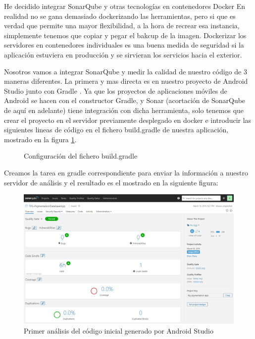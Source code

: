 He decidido integrar SonarQube y otras tecnologías en contenedores Docker \cite{docker} En realidad no se gana demasiado dockerizando las herramientas, pero si que es verdad que permite una mayor flexibilidad, a la hora de recrear esa instancia, simplemente tenemos que copiar y pegar el bakcup de la imagen. Dockerizar los servidores en contenedores individuales es una buena medida de seguridad si la aplicación estuviera en producción y se sirvieran los servicios hacia el exterior. 

Nosotros vamos a integrar SonarQube y medir la calidad de nuestro código de 3 maneras diferentes. La primera y mas directa es en nuestro proyecto de Android Studio junto con Gradle \cite{gradle}. Ya que los proyectos de aplicaciones móviles de Android se hacen con el constructor Gradle, y Sonar (acortación de SonarQube de aquí en adelante) tiene integración con dicha herramienta, solo tenemos que crear el proyecto en el servidor previamente desplegado en docker e introducir las siguientes lineas de código en el fichero build.gradle de nuestra aplicación, mostrado en la figura \ref{fig:buildGradle}.

\begin{figure} \label{fig:buildGradle}

\caption{Configuración del fichero build.gradle}
\end{figure}

Creamos la tarea en gradle correspondiente para enviar la información a nuestro servidor de análisis y el resultado es el mostrado en la siguiente figura: 

\begin{figure}[H]
    \centering
    \includegraphics[scale=0.35]{imagenes/fundamentosHerramientas/sonarqube1.png}
    \caption{Primer análisis del código inicial generado por Android Studio}
    \label{fig:mainSonar}
\end{figure}

